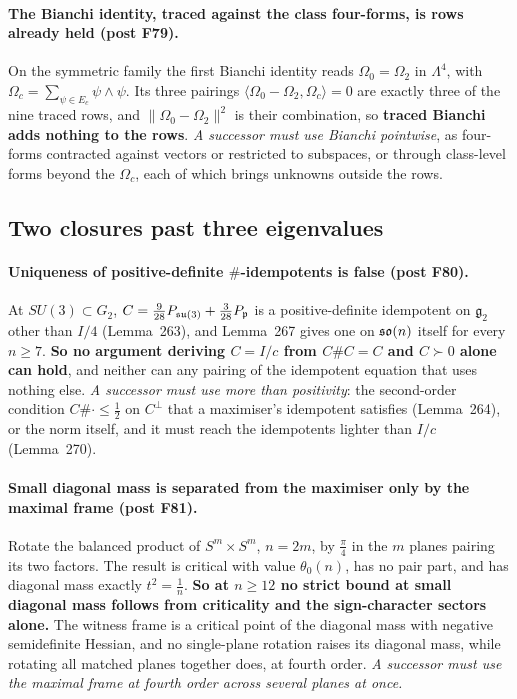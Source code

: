 \paragraph{The Bianchi identity, traced against the class four-forms, is rows already held (post F79).} On the symmetric family the first Bianchi identity reads $\Omega_0=\Omega_2$ in $\Lambda^4$, with $\Omega_c=\sum_{\psi\in E_c}\psi\wedge\psi$. Its three pairings $\langle\Omega_0-\Omega_2,\Omega_c\rangle=0$ are exactly three of the nine traced rows, and $\lVert\Omega_0-\Omega_2\rVert^2$ is their combination, so \textbf{traced Bianchi adds nothing to the rows}. \emph{A successor must use Bianchi pointwise}, as four-forms contracted against vectors or restricted to subspaces, or through class-level forms beyond the $\Omega_c$, each of which brings unknowns outside the rows.

\subsection{Two closures past three eigenvalues}\label{sec:latefences}

\paragraph{Uniqueness of positive-definite $\#$-idempotents is false (post F80).} At $SU(3)\subset G_2$, $C=\tfrac9{28}P_{\mathfrak{su}(3)}+\tfrac3{28}P_{\mathfrak{p}}$ is a positive-definite idempotent on $\mathfrak g_2$ other than $I/4$ (Lemma~263), and Lemma~267 gives one on $\mathfrak{so}(n)$ itself for every $n\ge7$. \textbf{So no argument deriving $C=I/c$ from $C\#C=C$ and $C\succ0$ alone can hold}, and neither can any pairing of the idempotent equation that uses nothing else. \emph{A successor must use more than positivity}: the second-order condition $C\#\cdot\le\tfrac12$ on $C^\perp$ that a maximiser's idempotent satisfies (Lemma~264), or the norm itself, and it must reach the idempotents lighter than $I/c$ (Lemma~270).

\paragraph{Small diagonal mass is separated from the maximiser only by the maximal frame (post F81).} Rotate the balanced product of $S^m\times S^m$, $n=2m$, by $\tfrac\pi4$ in the $m$ planes pairing its two factors. The result is critical with value $\theta_0(n)$, has no pair part, and has diagonal mass exactly $t^2=\tfrac1n$. \textbf{So at $n\ge12$ no strict bound at small diagonal mass follows from criticality and the sign-character sectors alone.} The witness frame is a critical point of the diagonal mass with negative semidefinite Hessian, and no single-plane rotation raises its diagonal mass, while rotating all matched planes together does, at fourth order. \emph{A successor must use the maximal frame at fourth order across several planes at once.}

